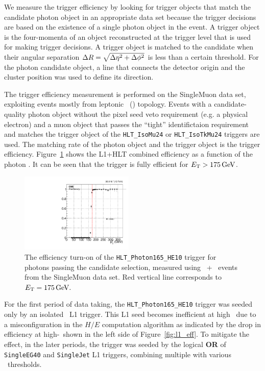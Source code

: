 We measure the trigger efficiency by looking for trigger objects that match the candidate photon object in an appropriate data set because the trigger decisions are based on the existence of a single photon object in the event.
A trigger object is the four-momenta of an object reconstructed at the trigger level that is used for making trigger decisions. 
A trigger object is matched to the candidate when their angular separation  $\Delta R = \sqrt{\Delta \eta^2 + \Delta \phi^2}$ is less than a certain threshold.
For the photon candidate object, a line that connects the detector origin and the cluster position was used to define its direction.

The trigger efficiency measurement is performed on the SingleMuon data set, exploiting events mostly from leptonic \ttbar\ (\Pe\Pgm) topology. 
Events with a candidate-quality photon object without the pixel seed veto requirement (e.g. a physical electron) and a muon object that passes the ``tight'' identifictaion requirement and matches the trigger object of the \texttt{HLT\_IsoMu24} or \texttt{HLT\_IsoTkMu24} triggers are used.
The matching rate of the photon object and the trigger object is the trigger efficiency. 
Figure~\ref{fig:hlt_eff} shows the L1+HLT combined efficiency as a function of the photon \ET. 
It can be seen that the trigger is fully efficient for $E_{\mathrm{T}} > 175\,\text{Ge\hspace{-.08em}V}$.

\begin{figure}[htbp]
  \centering
  \includegraphics[width=0.48\textwidth]{Analysis/Figures/trigger/photon_elmu_sph165abs_ptzoom.pdf}
  \caption{
    The efficiency turn-on of the \texttt{HLT\_Photon165\_HE10} trigger for photons passing the candidate selection, measured using \Pgm\ + \egamma\ events from the SingleMuon data set. 
    Red vertical line corresponds to $E_{\mathrm{T}} = 175\,\text{Ge\hspace{-.08em}V}.$
  }
  \label{fig:hlt_eff}
\end{figure}

For the first period of data taking, the \texttt{HLT\_Photon165\_HE10} trigger was seeded only by an isolated \egamma\ L1 trigger. 
This L1 seed becomes inefficient at high \ET\ due to a misconfiguration in the $H/E$ computation algorithm as indicated by the drop in efficiency at high-\ET\ shown in the left side of Figure~\ref{fig:l1_eff}. 
To mitigate the effect, in the later periods, the trigger was seeded by the logical \textbf{OR} of \texttt{SingleEG40} and \texttt{SingleJet} L1 triggers, combining multiple with various \pt\ thresholds. 

